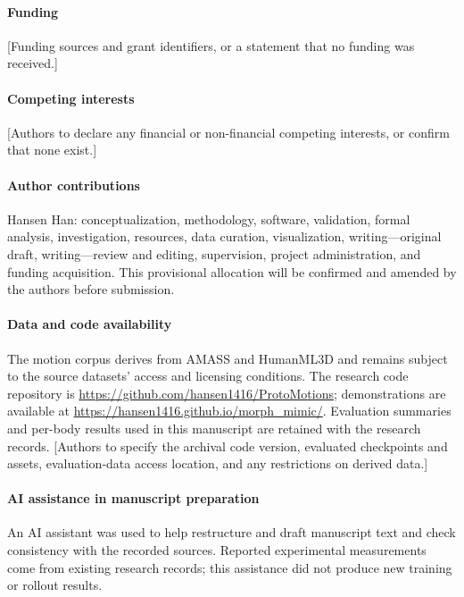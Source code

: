 \documentclass[11pt]{article}
\begin{document}
\paragraph{Funding}
[Funding sources and grant identifiers, or a statement that no funding was received.]

\paragraph{Competing interests}
[Authors to declare any financial or non-financial competing interests,
or confirm that none exist.]

\paragraph{Author contributions}
Hansen Han: conceptualization, methodology, software, validation, formal
analysis, investigation, resources, data curation, visualization,
writing---original draft, writing---review and editing, supervision,
project administration, and funding acquisition.
This provisional allocation will be confirmed and amended by the authors
before submission.

\paragraph{Data and code availability}
The motion corpus derives from AMASS and HumanML3D and remains subject to
the source datasets' access and licensing conditions. The research code
repository is \url{https://github.com/hansen1416/ProtoMotions}; demonstrations
are available at \url{https://hansen1416.github.io/morph_mimic/}.
Evaluation summaries and per-body results used in this manuscript are
retained with the research records.
[Authors to specify the archival code version, evaluated checkpoints and
assets, evaluation-data access location, and any restrictions on derived data.]

\paragraph{AI assistance in manuscript preparation}
An AI assistant was used to help restructure and draft manuscript text and
check consistency with the recorded sources. Reported experimental
measurements come from existing research records; this assistance did not
produce new training or rollout results.
\end{document}
